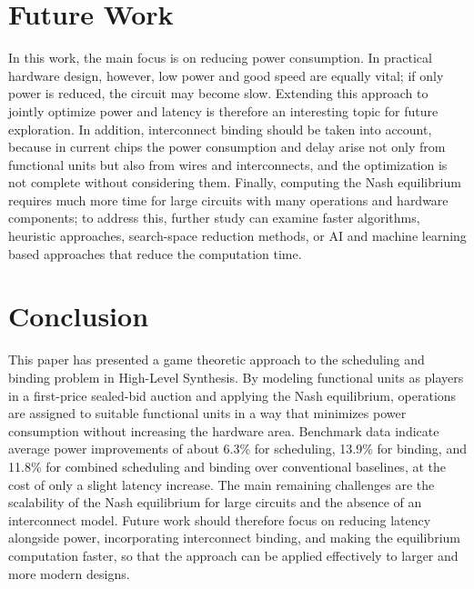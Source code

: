 \documentclass[conference]{IEEEtran}
\begin{document}
\section{Future Work}

In this work, the main focus is on reducing power consumption. In
practical hardware design, however, low power and good speed are
equally vital; if only power is reduced, the circuit may become slow.
Extending this approach to jointly optimize power and latency is
therefore an interesting topic for future exploration. In addition,
interconnect binding should be taken into account, because in current
chips the power consumption and delay arise not only from functional
units but also from wires and interconnects, and the optimization is
not complete without considering them. Finally, computing the Nash
equilibrium requires much more time for large circuits with many
operations and hardware components; to address this, further study can
examine faster algorithms, heuristic approaches, search-space reduction
methods, or AI and machine learning based approaches that reduce the
computation time.

\section{Conclusion}

This paper has presented a game theoretic approach to the scheduling
and binding problem in High-Level Synthesis. By modeling functional
units as players in a first-price sealed-bid auction and applying the
Nash equilibrium, operations are assigned to suitable functional units
in a way that minimizes power consumption without increasing the
hardware area. Benchmark data indicate average power improvements of
about 6.3\% for scheduling, 13.9\% for binding, and 11.8\% for combined
scheduling and binding over conventional baselines, at the cost of only
a slight latency increase. The main remaining challenges are the
scalability of the Nash equilibrium for large circuits and the absence
of an interconnect model. Future work should therefore focus on
reducing latency alongside power, incorporating interconnect binding,
and making the equilibrium computation faster, so that the approach can
be applied effectively to larger and more modern designs.
\end{document}

